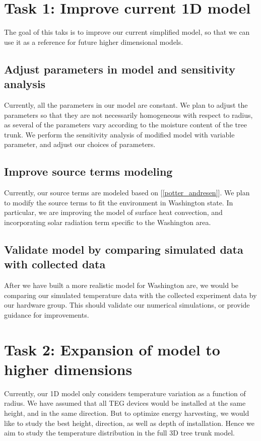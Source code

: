 \documentclass[12pt]{article}
\begin{document}
\section{Task 1: Improve current 1D model}
The goal of this taks is to improve our current simplified model, so that we can use it as a reference for future higher dimensional models. 
\subsection{Adjust parameters in model and sensitivity analysis}
Currently, all the parameters in our model are constant. We plan to adjust the parameters so that they are not necessarily homogeneous with respect to radius, as several of the parameters vary according to the moisture content of the tree trunk. We perform the sensitivity analysis of modified model with variable parameter, and adjust our choices of parameters.


\subsection{Improve source terms modeling}
Currently, our source terms are modeled based on [\ref{potter_andresen}]. We plan to modify the source terms to fit the environment in Washington state. In particular, we are improving the model of surface heat convection, and incorporating solar radiation term specific to the Washington area.


\subsection{Validate model by comparing simulated data with collected data}
After we have built a more realistic model for Washington are, we would be comparing our simulated temperature data with the collected experiment data by our hardware group. This should validate our numerical simulations, or provide guidance for improvements.


\section{Task 2: Expansion of model to higher dimensions}
Currently, our 1D model only considers temperature variation as a function of radius. We have assumed that all TEG devices would be installed at the same height, and in the same direction. But to optimize energy harvesting, we would like to study the best height, direction, as well as depth of installation. Hence we aim to study the temperature distribution in the full 3D tree trunk model. 
\end{document}
